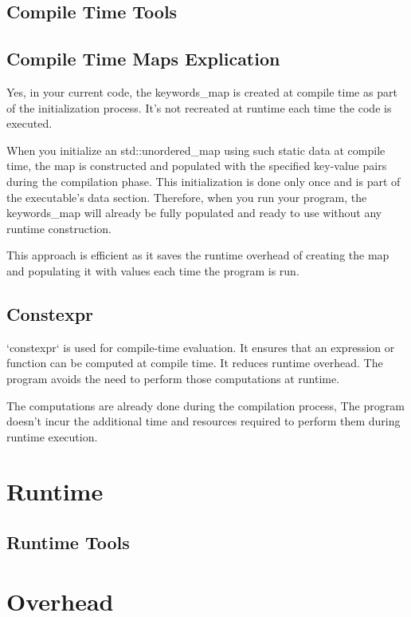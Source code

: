 \documentclass[openany]{report}
\begin{document}
\subsection{Compile Time Tools}


\subsection{Compile Time Maps Explication}

Yes, in your current code,
the keywords_map is created at compile time as part of the initialization process.
It's not recreated at runtime each time the code is executed.


When you initialize an std::unordered_map using such static data at compile time,
the map is constructed and populated with the specified key-value pairs during the compilation phase.
This initialization is done only once and is part of the executable's data section.
Therefore, when you run your program,
the keywords\_map will already be fully populated and ready to use without any runtime construction.

This approach is efficient as it saves the runtime overhead of creating the map
and populating it with values each time the program is run.


\subsection{Constexpr}

`constexpr` is used for compile-time evaluation.
It ensures that an expression or function can be computed at compile time.
It reduces runtime overhead.
The program avoids the need to perform those computations at runtime. 

The computations are already done during the compilation process, 
The program doesn't incur the additional time and resources required
to perform them during runtime execution.

\section{Runtime}

\subsection{Runtime Tools}


\section{Overhead}
\end{document}

